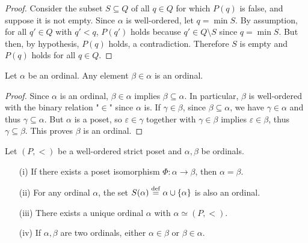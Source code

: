 \begin{proof}
    Consider the subset $S \subseteq Q$ of all $q \in Q$ for which $P(q)$ is false, and suppose it is not empty. Since $\alpha$ is well-ordered, let $q = \min S$. By assumption, for all $q' \in Q$ with $q' < q$, $P(q')$ holds because $q' \in Q \setminus S$ since $q = \min S$. But then, by hypothesis, $P(q)$ holds, a contradiction. Therefore $S$ is empty and $P(q)$ holds for all $q \in Q$.
\end{proof}

\begin{proposition} \label{elements-of-ordinals-are-ordinals}
    Let $\alpha$ be an ordinal. Any element $\beta \in \alpha$ is an ordinal.
\end{proposition}

\begin{proof}
    Since $\alpha$ is an ordinal, $\beta \in \alpha$ implies $\beta \subseteq \alpha$. In particular, $\beta$ is well-ordered with the binary relation "$\in$" since $\alpha$ is. If $\gamma \in \beta$, since $\beta \subseteq \alpha$, we have $\gamma \in \alpha$ and thus $\gamma \subseteq \alpha$. But $\alpha$ is a poset, so $\varepsilon \in \gamma$ together with $\gamma \in \beta$ implies $\varepsilon \in \beta$, thus $\gamma \subseteq \beta$. This proves $\beta$ is an ordinal.
\end{proof}

\begin{theorem} \label{unicity-of-ordinals}
    Let $(P,<)$ be a well-ordered strict poset and $\alpha,\beta$ be ordinals.
    \\

    \begin{itemize}
        \item[(i)] If there exists a poset isomorphism $\Phi : \alpha \to \beta$, then $\alpha = \beta$. 
        \\

        \item[(ii)] For any ordinal $\alpha$, the set $S(\alpha) \overset{\mathrm{def}}{=} \alpha \cup \{\alpha\}$ is also an ordinal.
        \\

        \item[(iii)] There exists a unique ordinal $\alpha$ with $\alpha \simeq (P,<)$. 
        \\

        \item[(iv)] If $\alpha, \beta$ are two ordinals, either $\alpha \in \beta$ or $\beta \in \alpha$.
        \\
    \end{itemize}
\end{theorem}

